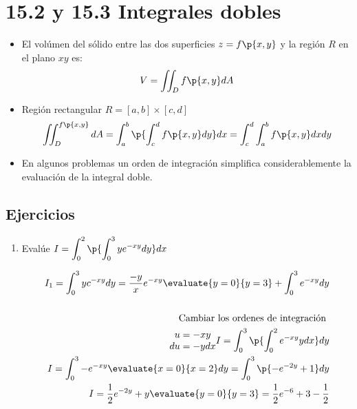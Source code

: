 \section{15.2 y 15.3 Integrales dobles}
\begin{itemize}
    \item El volúmen del sólido entre las dos superficies $\displaystyle z=f\p{x,y} $ y la región $R$ en el plano $xy$ es:
        \[
          V = \iint_{D}^{} f\p{x,y} dA 
        \]
    
    \item Región rectangular $\displaystyle R = [a,b] \times [c,d]$ 
        \[
          \iint_{D}^{f\p{x,y} }dA = \int_{a}^{b} \p{\int_{c}^{d} f\p{x,y}dy  }dx = \int_{c}^{d}\int_{a}^{b}f\p{x,y} dxdy 
        \]
    
    \item En algunos problemas un orden de integración simplifica considerablemente la evaluación de la integral doble.
\end{itemize}


\subsection{Ejercicios}
\begin{enumerate}
    \item Evalúe $\displaystyle I = \int_{0}^{2}\p{\int_{0}^{3}ye^{-xy}dy} dx$ 
        \begin{center}
           \begin{align*}
               I_1 = \int_{0}^{3}yc^{-xy}dy = \frac{-y}{x} e^{-xy} \evaluate{y=0}{y=3} + \int_{0}^{3}e^{-xy}dy \\ 
               \\
               \text{ Cambiar los ordenes de integración } \\ 
               \begin{matrix}
                   u = -xy \\ 
                   du = -ydx \\ 
               \end{matrix}
               I = \int_{0}^{3}\p{\int_{0}^{2}e^{-xy}ydx} dy \\ 
               I = \int_{0}^{3}-e^{-xy}\evaluate{x=0}{x=2} dy = \int_{0}^{3}\p{-e^{-2y}+1}dy \\ 
               I = \frac{1}{2} e^{-2y} + y \evaluate{y=0}{y=3} = \frac{1}{2} e^{-6}+3-\frac{1}{2} \\  
           \end{align*}
        \end{center}
\end{enumerate}


